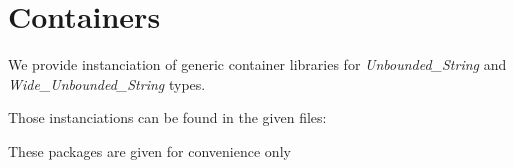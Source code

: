 \documentclass[english,letterpaper]{book}
\begin{document}
\section{Containers}
\label{api:containers}

We provide instanciation of generic container libraries for \emph{Unbounded\_String} and \emph{Wide\_Unbounded\_String} types.

Those instanciations can be found in the given files:












These packages are given for convenience only
\end{document}
